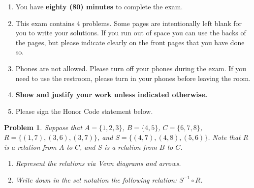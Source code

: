 \documentclass[]{exam}  %
\newtheorem{problem}{Problem}
\begin{document}
	\begin{enumerate}
		\item You have \textbf{eighty (80) minutes} to complete the exam.  
		\item This exam contains 4 problems. Some pages are intentionally left blank for you to write your solutions. If you run out of space you can use the backs of the pages, but please indicate clearly on the front pages that you have done so.
		
		
		\item Phones are not allowed. Please turn off your phones during the exam.
            If you need to use the restroom, please turn in your phones before leaving the room.
		
		\item \textbf{Show and justify your work unless indicated otherwise.}

		\item Please sign the Honor Code statement below.
	\end{enumerate}
	


    \newpage
\begin{problem}
    Suppose that $A = \{1,2,3\}$, $B = \{4,5\}$, $C = \{6,7,8\}$, $R = \{(1,7), (3,6), (3,7)\}$, and $S = \{(4,7), (4,8), (5,6)\}$. Note that $R$ is a relation from $A$ to $C$, and $S$ is a relation from $B$ to $C$. 

    \begin{enumerate}
        \item Represent the relations via Venn diagrams and arrows.
        \item Write down in the set notation the following relation: 
         $S^{-1} \circ R$.
    \end{enumerate}
    \newpage

\end{problem}
\end{document}
